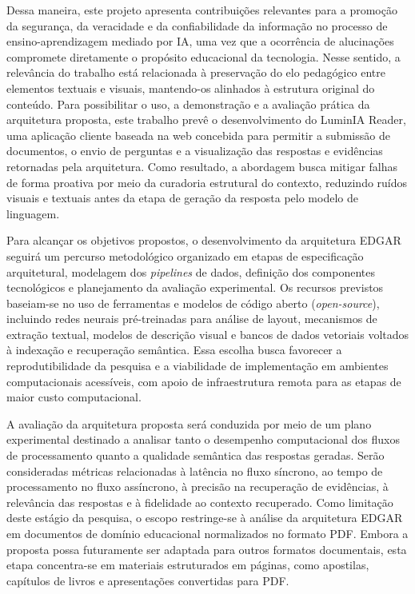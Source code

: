 Dessa maneira, este projeto apresenta contribuições relevantes para a promoção da segurança, da veracidade e da confiabilidade da informação no processo de ensino-aprendizagem mediado por IA, uma vez que a ocorrência de alucinações compromete diretamente o propósito educacional da tecnologia. Nesse sentido, a relevância do trabalho está relacionada à preservação do elo pedagógico entre elementos textuais e visuais, mantendo-os alinhados à estrutura original do conteúdo. Para possibilitar o uso, a demonstração e a avaliação prática da arquitetura proposta, este trabalho prevê o desenvolvimento do LuminIA Reader, uma aplicação cliente baseada na web concebida para permitir a submissão de documentos, o envio de perguntas e a visualização das respostas e evidências retornadas pela arquitetura. Como resultado, a abordagem busca mitigar falhas de forma proativa por meio da curadoria estrutural do contexto, reduzindo ruídos visuais e textuais antes da etapa de geração da resposta pelo modelo de linguagem.

Para alcançar os objetivos propostos, o desenvolvimento da arquitetura EDGAR seguirá um percurso metodológico organizado em etapas de especificação arquitetural, modelagem dos \textit{pipelines} de dados, definição dos componentes tecnológicos e planejamento da avaliação experimental. Os recursos previstos baseiam-se no uso de ferramentas e modelos de código aberto (\textit{open-source}), incluindo redes neurais pré-treinadas para análise de layout, mecanismos de extração textual, modelos de descrição visual e bancos de dados vetoriais voltados à indexação e recuperação semântica. Essa escolha busca favorecer a reprodutibilidade da pesquisa e a viabilidade de implementação em ambientes computacionais acessíveis, com apoio de infraestrutura remota para as etapas de maior custo computacional.

A avaliação da arquitetura proposta será conduzida por meio de um plano experimental destinado a analisar tanto o desempenho computacional dos fluxos de processamento quanto a qualidade semântica das respostas geradas. Serão consideradas métricas relacionadas à latência no fluxo síncrono, ao tempo de processamento no fluxo assíncrono, à precisão na recuperação de evidências, à relevância das respostas e à fidelidade ao contexto recuperado. Como limitação deste estágio da pesquisa, o escopo restringe-se à análise da arquitetura EDGAR em documentos de domínio educacional normalizados no formato PDF. Embora a proposta possa futuramente ser adaptada para outros formatos documentais, esta etapa concentra-se em materiais estruturados em páginas, como apostilas, capítulos de livros e apresentações convertidas para PDF.

